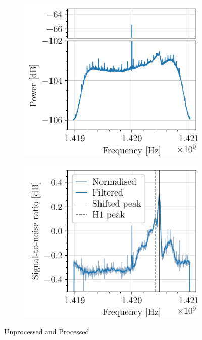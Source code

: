 \begin{figure}
    \begin{subfigure}{0.49\textwidth}
        \centering
        \includegraphics[scale=1]{figures/raw_signal.pdf}
        \caption{}
        \label{fig:raw_signal}
    \end{subfigure}
    \begin{subfigure}{0.49\textwidth}
        \centering
        \includegraphics[scale=1]{figures/clean_signal.pdf}
        \caption{}
        \label{fig:clean_signal}
    \end{subfigure}
    \caption{Unprocessed and Processed}
    \label{fig:process_example}
\end{figure}


